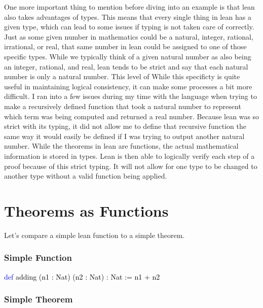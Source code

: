 \documentclass[
  letterpaper,
]{scrreprt}
\newenvironment{Shaded}{\begin{snugshade}}{\end{snugshade}}
\newcommand{\KeywordTok}[1]{\textcolor[rgb]{0.00,0.23,0.31}{#1}}
\newcommand{\NormalTok}[1]{\textcolor[rgb]{0.00,0.23,0.31}{#1}}
\renewcommand{\NormalTok}[1]{\textcolor[HTML]{000000}{#1}}
\renewcommand{\KeywordTok}[1]{\textcolor[HTML]{0000FF}{#1}}
\theoremstyle{remark}
\begin{document}
One more important thing to mention before diving into an example is
that lean also takes advantages of types. This means that every single
thing in lean has a given type, which can lead to some issues if typing
is not taken care of correctly. Just as some given number in mathematics
could be a natural, integer, rational, irrational, or real, that same
number in lean could be assigned to one of those specific types. While
we typically think of a given natural number as also being an integer,
rational, and real, lean tends to be strict and say that each natural
number is only a natural number. This level of While this specificty is
quite useful in maintaining logical consistency, it can make some
processes a bit more difficult. I ran into a few issues during my time
with the language when trying to make a recursively defined function
that took a natural number to represent which term was being computed
and returned a real number. Because lean was so strict with its typing,
it did not allow me to define that recursive function the same way it
would easily be defined if I was trying to output another natural
number. While the theorems in lean are functions, the actual
mathematical information is stored in types. Lean is then able to
logically verify each step of a proof because of this strict typing. It
will not allow for one type to be changed to another type without a
valid function being applied.

\hypertarget{theorems-as-functions}{%
\section{Theorems as Functions}\label{theorems-as-functions}}

Let's compare a simple lean function to a simple theorem.

\hypertarget{simple-function}{%
\subsubsection{Simple Function}\label{simple-function}}

\begin{Shaded}
\begin{Highlighting}[]
\KeywordTok{def}\NormalTok{ adding (n1 : Nat) (n2 : Nat) : Nat := }
\NormalTok{  n1 + n2}
\end{Highlighting}
\end{Shaded}

\hypertarget{simple-theorem}{%
\subsubsection{Simple Theorem}\label{simple-theorem}}
\end{document}
